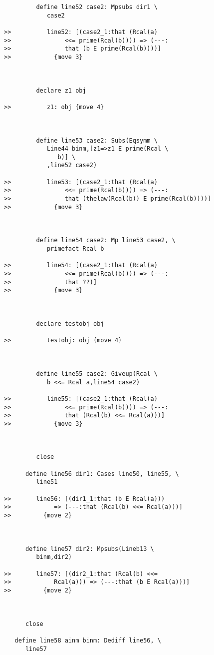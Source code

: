 \documentclass[12pt]{article}
\begin{document}
\begin{verbatim}
         define line52 case2: Mpsubs dir1 \
            case2

>>          line52: [(case2_1:that (Rcal(a)
>>               <<= prime(Rcal(b)))) => (---:
>>               that (b E prime(Rcal(b))))]
>>            {move 3}



         declare z1 obj

>>          z1: obj {move 4}



         define line53 case2: Subs(Eqsymm \
            Line44 binm,[z1=>z1 E prime(Rcal \
               b)] \
            ,line52 case2)

>>          line53: [(case2_1:that (Rcal(a)
>>               <<= prime(Rcal(b)))) => (---:
>>               that (thelaw(Rcal(b)) E prime(Rcal(b))))]
>>            {move 3}



         define line54 case2: Mp line53 case2, \
            primefact Rcal b

>>          line54: [(case2_1:that (Rcal(a)
>>               <<= prime(Rcal(b)))) => (---:
>>               that ??)]
>>            {move 3}



         declare testobj obj

>>          testobj: obj {move 4}



         define line55 case2: Giveup(Rcal \
            b <<= Rcal a,line54 case2)

>>          line55: [(case2_1:that (Rcal(a)
>>               <<= prime(Rcal(b)))) => (---:
>>               that (Rcal(b) <<= Rcal(a)))]
>>            {move 3}



         close

      define line56 dir1: Cases line50, line55, \
         line51

>>       line56: [(dir1_1:that (b E Rcal(a)))
>>            => (---:that (Rcal(b) <<= Rcal(a)))]
>>         {move 2}



      define line57 dir2: Mpsubs(Lineb13 \
         binm,dir2)

>>       line57: [(dir2_1:that (Rcal(b) <<=
>>            Rcal(a))) => (---:that (b E Rcal(a)))]
>>         {move 2}



      close

   define line58 ainm binm: Dediff line56, \
      line57


\end{verbatim}
\end{document}
